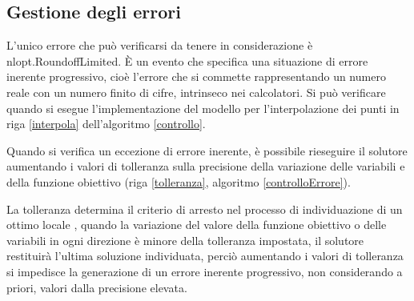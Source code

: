 \documentclass[a4paper,12pt]{report}
\begin{document}
\subsection{Gestione degli errori}
\label{ss:errori}
L'unico errore che può verificarsi da tenere in considerazione è nlopt.RoundoffLimited. È un evento che specifica una situazione di errore inerente progressivo, cioè l'errore che si commette rappresentando un numero reale con un numero finito di cifre, intrinseco nei calcolatori.
Si può verificare quando si esegue l'implementazione del modello per l'interpolazione dei punti in riga \ref{interpola} dell'algoritmo \ref{controllo}.

Quando si verifica un eccezione di errore inerente, è possibile rieseguire il solutore aumentando i valori di tolleranza sulla precisione della variazione delle variabili e della funzione obiettivo (riga \ref{tolleranza}, algoritmo \ref{controlloErrore}).

La tolleranza determina il criterio di arresto nel processo di individuazione di un ottimo locale \cite{nlopt}, quando la variazione del valore della funzione obiettivo o delle variabili in ogni direzione è minore della tolleranza impostata, il solutore restituirà l'ultima soluzione individuata, perciò aumentando i valori di tolleranza si impedisce la generazione di un errore inerente progressivo, non considerando a priori, valori dalla precisione elevata.
\end{document}
